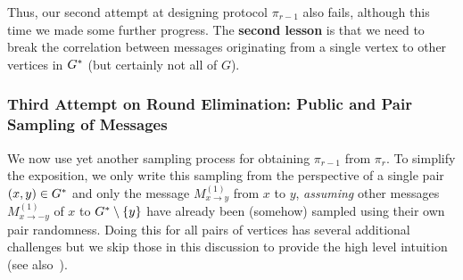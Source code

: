\documentclass[11pt]{article}
\theoremstyle{definition}
\newcommand{\set}[1]{\ensuremath{\left\{ #1 \right\}}}
\newcommand{\prot}{\ensuremath{\pi}}
\begin{document}
Thus, our second attempt at designing protocol $\prot_{r-1}$ also fails, although this time we made some further progress. The \textbf{second lesson} is that 
we need to break the correlation between messages originating from a single vertex to other vertices in $G^*$ (but certainly not all of $G$). 

\subsubsection{Third Attempt on Round Elimination: Public and Pair Sampling of Messages}\label{sec:attempt3}

We now use yet another sampling process for obtaining $\prot_{r-1}$ from $\prot_r$. 
To simplify the exposition, we only write this sampling from the perspective of a single pair $(x,y) \in G^*$ and only the message $M^{(1)}_{x \rightarrow y}$ from $x$ to $y$, 
\emph{assuming} other messages $M^{(1)}_{x \rightarrow -y}$ of $x$ to $\Gstar \setminus \set{y}$ have already been (somehow) sampled using their own pair randomness. 
Doing this for all pairs of vertices has several additional challenges but we skip those in this discussion to provide the high level intuition (see also~). 
\end{document}
